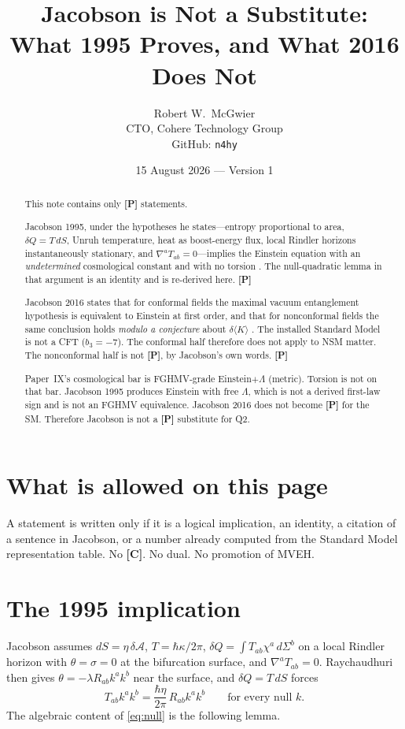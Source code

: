 \documentclass[11pt]{article}
\title{\textbf{Jacobson is Not a \pP{} Substitute:\\
What 1995 Proves, and What 2016 Does Not}}
\author{Robert W.\ McGwier\\
\small CTO, Cohere Technology Group\\
\small GitHub: \texttt{n4hy}}
\date{15 August 2026 --- Version 1}
\theoremstyle{definition}
\newcommand{\pP}{\textbf{[P]}}
\begin{document}
\maketitle

\begin{abstract}
\noindent
This note contains only \pP{} statements.

Jacobson 1995, under the hypotheses he states---entropy proportional
to area, $\delta Q=T\,dS$, Unruh temperature, heat as boost-energy
flux, local Rindler horizons instantaneously stationary, and
$\nabla^a T_{ab}=0$---implies the Einstein equation with an
\emph{undetermined} cosmological constant and with no torsion
\cite{Jacobson1995}. The null-quadratic lemma in that argument is
an identity and is re-derived here. \pP{}

Jacobson 2016 states that for conformal fields the maximal vacuum
entanglement hypothesis is equivalent to Einstein at first order,
and that for nonconformal fields the same conclusion holds
\emph{modulo a conjecture} about $\delta\langle K\rangle$
\cite{Jacobson2016}. The installed Standard Model is not a CFT
($b_3=-7$). The conformal half therefore does not apply to NSM
matter. The nonconformal half is not \pP{}, by Jacobson's own
words. \pP{}

Paper~IX's cosmological bar is FGHMV-grade Einstein$+\Lambda$
(metric). Torsion is not on that bar. Jacobson 1995 produces
Einstein with free $\Lambda$, which is not a derived first-law sign
and is not an FGHMV equivalence. Jacobson 2016 does not become
\pP{} for the SM. Therefore Jacobson is not a \pP{} substitute
for Q2.
\end{abstract}

\section*{What is allowed on this page}

A statement is written only if it is a logical implication, an
identity, a citation of a sentence in Jacobson, or a number
already computed from the Standard Model representation table.
No \textbf{[C]}. No dual. No promotion of MVEH.

\section{The 1995 implication}

Jacobson assumes $dS=\eta\,\delta\mathcal{A}$,
$T=\hbar\kappa/2\pi$, $\delta Q=\int T_{ab}\chi^a\,d\Sigma^b$ on a
local Rindler horizon with $\theta=\sigma=0$ at the bifurcation
surface, and $\nabla^a T_{ab}=0$. Raychaudhuri then gives
$\theta=-\lambda R_{ab}k^ak^b$ near the surface, and
$\delta Q=T\,dS$ forces
\begin{equation}
T_{ab}k^ak^b
=
\frac{\hbar\eta}{2\pi}\,R_{ab}k^ak^b
\qquad\text{for every null }k.
\label{eq:null}
\end{equation}
The algebraic content of \eqref{eq:null} is the following lemma.
\end{document}
